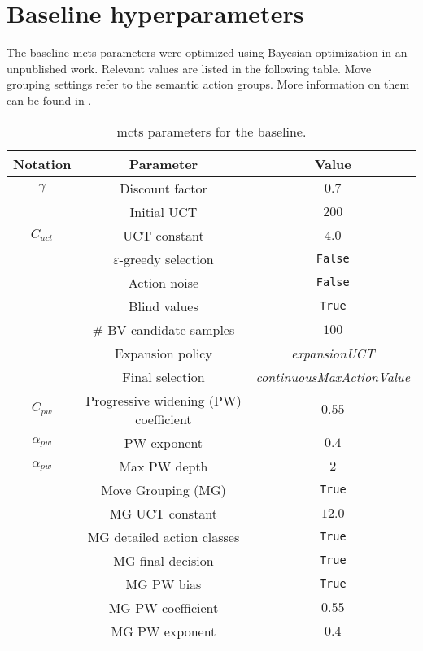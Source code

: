 \section{Baseline hyperparameters}\label{app:baseline_hyperparameters}
The baseline \gls{mcts} parameters were optimized using Bayesian optimization in an unpublished work. Relevant values are listed in the following table. Move grouping settings refer to the semantic action groups. More information on them can be found in \cite{kurzerDecentralizedCooperativePlanning2018}.
\begin{table}[H]
    \centering
    \begin{tabular}{c c c}
    \toprule
    \textbf{Notation} & \textbf{Parameter} & \textbf{Value}\\
    \toprule
    $\gamma$ & Discount factor & $0.7$ \\
     & Initial UCT & $200$ \\
     $C_{uct}$ & UCT constant & $4.0$ \\ 
     & $\varepsilon$-greedy selection & \texttt{False} \\
     & Action noise & \texttt{False} \\
     & Blind values & \texttt{True} \\
     & \# BV candidate samples & $100$ \\
     & Expansion policy & \emph{expansionUCT} \\
     & Final selection & \emph{continuousMaxActionValue} \\
    $C_{pw}$ & Progressive widening (PW) coefficient & $0.55$ \\
    $\alpha_{pw}$ & PW exponent & $0.4$ \\
    $\alpha_{pw}$ & Max PW depth & $2$ \\
     & Move Grouping (MG) & \texttt{True} \\
     & MG UCT constant & $12.0$\\
     & MG detailed action classes & \texttt{True} \\
     & MG final decision & \texttt{True} \\
     & MG PW bias & \texttt{True} \\
     & MG PW coefficient & $0.55$ \\
     & MG PW exponent & $0.4$ \\
    \toprule
    \end{tabular}
    \caption[MCTS hyperparameters for the baseline]{\gls{mcts} parameters for the baseline.}
    \label{tab:baseline_hyperparams}
\end{table}

